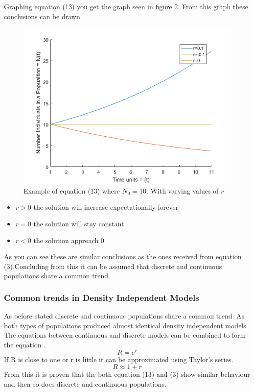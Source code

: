\documentclass[final]{cmpreport}
\begin{document}
	Graphing equation (13) you get the graph seen in figure 2. From this graph these conclusions can be drawn
	
	\begin{figure}[h!]
		\includegraphics[width=\textwidth]{SingleContinousPopulationGraph.png}
		\caption{Example of equation (13) where $N_0 = 10$. With varying values of $r$}  
	\end{figure}
	
	\begin{itemize}
		\item $r > 0$ the solution will increase expectationally forever
		\item $r = 0$ the solution will stay constant
		\item $r < 0$ the solution approach 0
	\end{itemize}

	As you can see these are similar conclusions as the ones received from equation (3).Concluding from this it can be assumed that discrete and continuous populations share a common trend.
	
	\subsubsection{Common trends in Density Independent Models}
	
	As before stated discrete and continuous populations share a common trend. As both types of populations produced almost identical density independent models. The equations between continuous and discrete models can be combined to form the equation .
	\begin{equation}
	 R= e^r 
	\end{equation}
	If R is close to one or r is little it can be approximated using Taylor's series.
	\begin{equation}
	 R \approx 1+r 
	\end{equation}
	From this it is proven that the both equation (13) and (3) show similar behaviour and then so does discrete and continuous populations.
		
\end{document}
